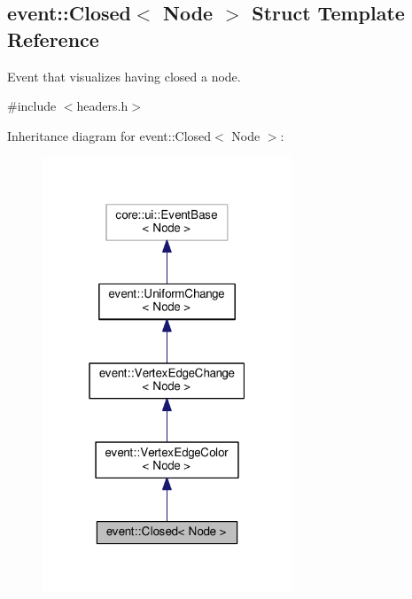 \hypertarget{structevent_1_1Closed}{}\subsection{event\+:\+:Closed$<$ Node $>$ Struct Template Reference}
\label{structevent_1_1Closed}


Event that visualizes having closed a node.  




{\ttfamily \#include $<$headers.\+h$>$}



Inheritance diagram for event\+:\+:Closed$<$ Node $>$\+:\nopagebreak
\begin{figure}[H]
\begin{center}
\leavevmode
\includegraphics[width=211pt]{structevent_1_1Closed__inherit__graph}
\end{center}
\end{figure}


